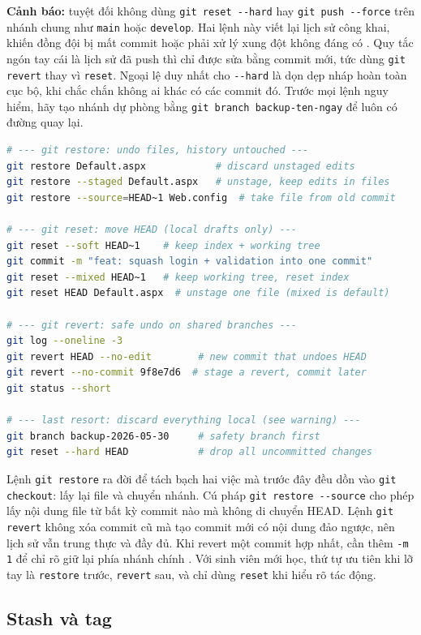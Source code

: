 \textbf{Cảnh báo:} tuyệt đối không dùng \verb|git reset --hard| hay \verb|git push --force| trên nhánh chung như \verb|main| hoặc \verb|develop|.
Hai lệnh này viết lại lịch sử công khai, khiến đồng đội bị mất commit hoặc phải xử lý xung đột không đáng có \cite{atlassiangit}.
Quy tắc ngón tay cái là lịch sử đã push thì chỉ được sửa bằng commit mới, tức dùng \verb|git revert| thay vì \verb|reset|.
Ngoại lệ duy nhất cho \verb|--hard| là dọn dẹp nháp hoàn toàn cục bộ, khi chắc chắn không ai khác có các commit đó.
Trước mọi lệnh nguy hiểm, hãy tạo nhánh dự phòng bằng \verb|git branch backup-ten-ngay| để luôn có đường quay lại.

\begin{lstlisting}[language=bash]
# --- git restore: undo files, history untouched ---
git restore Default.aspx            # discard unstaged edits
git restore --staged Default.aspx   # unstage, keep edits in files
git restore --source=HEAD~1 Web.config  # take file from old commit

# --- git reset: move HEAD (local drafts only) ---
git reset --soft HEAD~1    # keep index + working tree
git commit -m "feat: squash login + validation into one commit"
git reset --mixed HEAD~1   # keep working tree, reset index
git reset HEAD Default.aspx  # unstage one file (mixed is default)

# --- git revert: safe undo on shared branches ---
git log --oneline -3
git revert HEAD --no-edit        # new commit that undoes HEAD
git revert --no-commit 9f8e7d6  # stage a revert, commit later
git status --short

# --- last resort: discard everything local (see warning) ---
git branch backup-2026-05-30     # safety branch first
git reset --hard HEAD            # drop all uncommitted changes
\end{lstlisting}

Lệnh \verb|git restore| ra đời để tách bạch hai việc mà trước đây đều dồn vào \verb|git checkout|: lấy lại file và chuyển nhánh.
Cú pháp \verb|git restore --source| cho phép lấy nội dung file từ bất kỳ commit nào mà không di chuyển HEAD.
Lệnh \verb|git revert| không xóa commit cũ mà tạo commit mới có nội dung đảo ngược, nên lịch sử vẫn trung thực và đầy đủ.
Khi revert một commit hợp nhất, cần thêm \verb|-m 1| để chỉ rõ giữ lại phía nhánh chính \cite{progit}.
Với sinh viên mới học, thứ tự ưu tiên khi lỡ tay là \verb|restore| trước, \verb|revert| sau, và chỉ dùng \verb|reset| khi hiểu rõ tác động.
\subsection{Stash và tag}
\label{subsec:c22-stash-tag}

